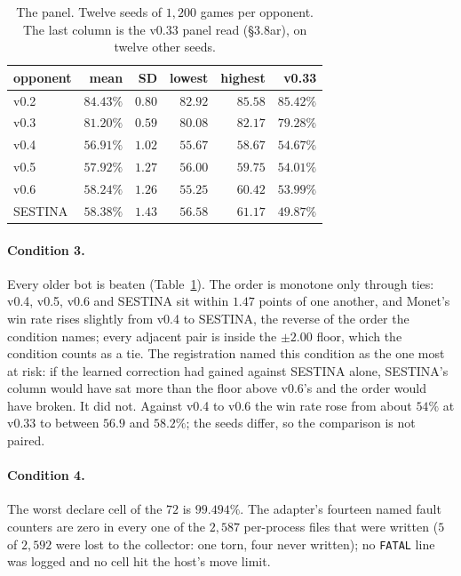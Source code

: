 \documentclass[11pt]{article}
\newcommand{\code}[1]{\texttt{#1}}
\newcommand{\sect}[1]{\S#1}
\begin{document}
\begin{table}[t]
\centering
\small
\caption{The panel. Twelve seeds of $1{,}200$ games per opponent. The last column is the v0.33 panel
read (\sect{3.8ar}), on twelve other seeds.}
\label{tab:panel}
\begin{tabular}{@{}lrrrrr@{}}
\toprule
opponent & mean & SD & lowest & highest & v0.33 \\
\midrule
v0.2    & $84.43\%$ & $0.80$ & $82.92$ & $85.58$ & $85.42\%$ \\
v0.3    & $81.20\%$ & $0.59$ & $80.08$ & $82.17$ & $79.28\%$ \\
v0.4    & $56.91\%$ & $1.02$ & $55.67$ & $58.67$ & $54.67\%$ \\
v0.5    & $57.92\%$ & $1.27$ & $56.00$ & $59.75$ & $54.01\%$ \\
v0.6    & $58.24\%$ & $1.26$ & $55.25$ & $60.42$ & $53.99\%$ \\
SESTINA & $58.38\%$ & $1.43$ & $56.58$ & $61.17$ & $49.87\%$ \\
\bottomrule
\end{tabular}
\end{table}

\paragraph{Condition 3.} Every older bot is beaten (Table~\ref{tab:panel}). The order is monotone only
through ties: v0.4, v0.5, v0.6 and SESTINA sit within $1.47$ points of one another, and Monet's win
rate rises slightly from v0.4 to SESTINA, the reverse of the order the condition names; every adjacent
pair is inside the $\pm 2.00$ floor, which the condition counts as a tie. The registration named this condition as the one most at risk: if the learned correction had
gained against SESTINA alone, SESTINA's column would have sat more than the floor above v0.6's and the
order would have broken. It did not. Against v0.4 to v0.6 the win rate rose from about $54\%$ at v0.33
to between $56.9$ and $58.2\%$; the seeds differ, so the comparison is not paired.

\paragraph{Condition 4.} The worst declare cell of the $72$ is $99.494\%$. The adapter's fourteen named
fault counters are zero in every one of the $2{,}587$ per-process files that were written ($5$ of
$2{,}592$ were lost to the collector: one torn, four never written); no \code{FATAL} line was
logged and no cell hit the host's move limit.
\end{document}
